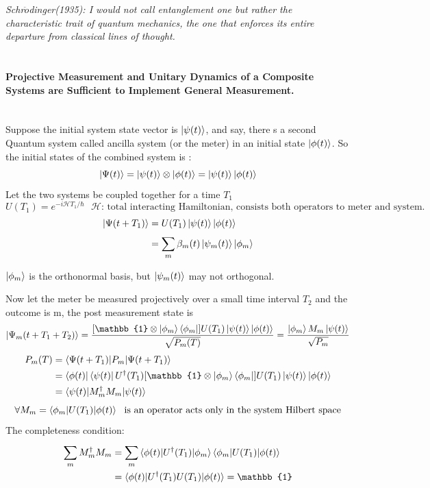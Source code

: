 \documentclass[]{book}
\theoremstyle{nonumberplain}
\begin{document}
\textit{Schr$\ddot{o}$dinger(1935): I would not call entanglement \emph{one} but rather the characteristic trait of quantum mechanics, \emph{the one} that enforces its entire departure from classical lines of thought.}\\ \\

\paragraph{Projective Measurement and Unitary Dynamics of a Composite Systems are Sufficient to Implement General Measurement.} \\
Suppose the initial system state vector is $\ket{\psi(t)}$, and say, there s a second Quantum system called ancilla system (or the meter) in an initial state $\ket{\phi(t)}$. So the initial states of the combined system is :
\[
    \ket{\Psi(t)}=\ket{\psi(t)}\otimes\ket{\phi(t)} = \ket{\psi(t)}\ket{\phi(t)}
\] 
Let the two systems be coupled together for a time $T_{1}$
\[
	U(T_1) = e^{-i\mathcal{H}T_{1}/\hbar} \ \ \ \mathcal{H}\text{: total interacting Hamiltonian, consists both operators to meter and system.} 
\] 
\begin{equation*}
\begin{aligned}
	\ket{\Psi(t+T_1)}&=U(T_{1})\ket{\psi(t)}\ket{\phi(t)}\\
						  &= \sum^{}_{m} \beta_{m}(t)\ket{\psi_{m}(t)}\ket{\phi_{m}} 
\end{aligned}
\end{equation*}

$\ket{\phi_{m}}$  is the orthonormal basis, but $\ket{\psi_{m}(t)}$ may not orthogonal. 

Now let the meter be measured projectively over a small time interval $T_{2}$ and the outcome is m, the post measurement state is 
\[
	\ket{\Psi_{m}(t+T_{1}+T_{2})} = \frac{[\mathbb{1}\otimes \ket{\phi_{m}}\bra{\phi_{m}}]U(T_{1})\ket{\psi(t)}\ket{\phi(t)}}{\sqrt{P_{m}(T)}}=\frac{\ket{\phi_{m}}M_{m}\ket{\psi(t)}}{\sqrt{P_{m}}}
\] 
\begin{equation*}
\begin{aligned}
	P_{m}(T) &= \braket{\Psi(t+T_{1})|P_{m}|\Psi(t+T_{1})} \\
					 &= \bra{\phi(t)}\bra{\psi(t)}U^{\dagger}(T_{1})[\mathbb{1}\otimes \ket{\phi_{m}}\bra{\phi_{m}}]U(T_{1})\ket{\psi(t)}\ket{\phi(t)}\\
					 &= \braket{\psi(t)|M_{m}^{\dagger}M_{m}|\psi(t)}\ \\ 
\end{aligned}
\end{equation*}
\[
	 \forall M_{m}=\braket{\phi_{m}|U(T_{1})|\phi(t)}\ \text{ is an operator acts only in the system Hilbert space}
\] 
The completeness condition:
\begin{equation*}
\begin{aligned}
    \sum^{}_{m} M_{m}^{\dagger}M_{m} &= \sum^{}_{m} \braket{\phi(t)|U^{\dagger}(T_{1})|\phi_{m}}\braket{\phi_{m}|U(T_{1})|\phi(t)}\\
    &=\braket{\phi(t)|U^{\dagger}(T_{1})U(T_{1})|\phi(t)} = \mathbb{1}
\end{aligned}
\end{equation*}
\end{document}

